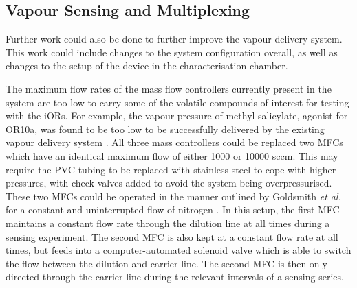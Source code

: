 \documentclass[
  a4paper,
]{scrbook}
\begin{document}
\hypertarget{sec-future-work-vapour}{%
\subsection{Vapour Sensing and
Multiplexing}\label{sec-future-work-vapour}}

Further work could also be done to further improve the vapour delivery
system. This work could include changes to the system configuration
overall, as well as changes to the setup of the device in the
characterisation chamber.

The maximum flow rates of the mass flow controllers currently present in
the system are too low to carry some of the volatile compounds of
interest for testing with the iORs. For example, the vapour pressure of
methyl salicylate, agonist for OR10a, was found to be too low to be
successfully delivered by the existing vapour delivery system
\autocite{MeSal}. All three mass controllers could be replaced two MFCs
which have an identical maximum flow of either 1000 or 10000 sccm. This
may require the PVC tubing to be replaced with stainless steel to cope
with higher pressures, with check valves added to avoid the system being
overpressurised. These two MFCs could be operated in the manner outlined
by Goldsmith \emph{et al.} for a constant and uninterrupted flow of
nitrogen \autocite{Goldsmith2011}. In this setup, the first MFC
maintains a constant flow rate through the dilution line at all times
during a sensing experiment. The second MFC is also kept at a constant
flow rate at all times, but feeds into a computer-automated solenoid
valve which is able to switch the flow between the dilution and carrier
line. The second MFC is then only directed through the carrier line
during the relevant intervals of a sensing series.
\end{document}
